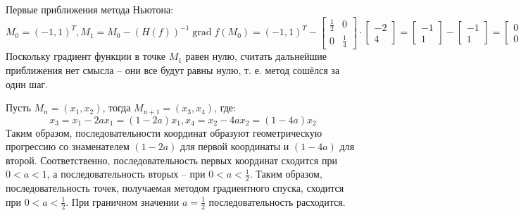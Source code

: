 \documentclass[11pt]{article}
\newcommand{\grad}{\operatorname{grad}}
\begin{document}
Первые приближения метода Ньютона:
\begin{equation*}
M_0 = (-1, 1)^T, M_1 = M_0 - (H(f))^{-1}\grad f(M_0) = (-1, 1)^T - \begin{bmatrix}
\frac12 & 0 \\
0 & \frac14
\end{bmatrix}
\cdot\begin{bmatrix}
-2 \\
4
\end{bmatrix} = \begin{bmatrix}
-1 \\
1
\end{bmatrix} - \begin{bmatrix}
-1 \\
1
\end{bmatrix} = \begin{bmatrix}
0 \\
0
\end{bmatrix}
\end{equation*}
Поскольку градиент функции в точке $M_1$ равен нулю, считать дальнейшие приближения нет смысла --
они все будут равны нулю, т. е. метод сошёлся за один шаг.

Пусть $M_n = (x_1, x_2)$, тогда $M_{n + 1} = (x_3, x_4)$, где:
\begin{equation}
x_3 = x_1 - 2ax_1 = (1 - 2a)x_1, x_4 = x_2 - 4ax_2 = (1 - 4a)x_2
\end{equation}
Таким образом, последовательности координат образуют геометрическую прогрессию со знаменателем
$(1 - 2a)$ для первой координаты и $(1 - 4a)$ для второй. Соответственно, последовательность
первых координат сходится при $0 < a < 1$, а последовательность вторых -- при $0 < a < \frac12$.
Таким образом, последовательность точек, получаемая методом градиентного спуска, сходится при
$0 < a < \frac12$. При граничном значении $a = \frac12$ последовательность расходится.
\end{document}
